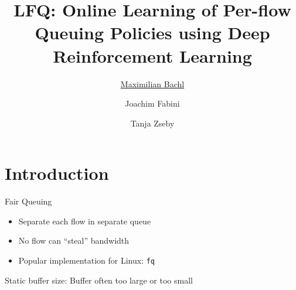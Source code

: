 \documentclass[xcolor={dvipsnames}]{beamer}
\title{LFQ: Online Learning of Per-flow Queuing Policies using Deep Reinforcement Learning}
\author[M. Bachl et al.]{%
	\underline{Maximilian Bachl}\email{maximilian.bachl@tuwien.ac.at} \and Joachim Fabini \and Tanja Zseby
}
\institute{%
	Technische Universität Wien, Vienna, Austria
}
\date[\mydate]{\mydate}
\begin{document}
\maketitle

\section{Introduction}

\begin{frame}{Fair Queuing}
  \begin{itemize}
  \item Separate each flow in separate queue
  \item No flow can ``steal'' bandwidth
  \item Popular implementation for Linux: \texttt{fq}
  \end{itemize}
  \pause
  \begin{alertblock}{Static buffer size:}
	Buffer often too large or too small 
  \end{alertblock}
\end{frame}



\end{document}
